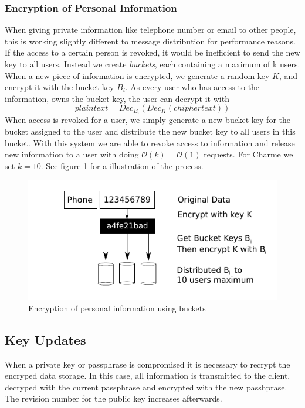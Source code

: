 \documentclass{scrartcl}
\begin{document}
  \subsubsection{Encryption of Personal Information}
  When giving private information like telephone number or email to other people, this is working slightly different to message distribution for performance reasons.  If the access to a certain person is revoked, it would be inefficient to send the new key to all users. Instead we create  \textit{buckets}, each containing a maximum of k users. When a new piece of information is encrypted, we generate a random key $K$, and encrypt it with the bucket key $B_i$. As every user who has access to the information, owns the bucket key, the user can decrypt it with
  $$
  plaintext = Dec_{B_i}({Dec_K(chiphertext)})
  $$
  When access is revoked for a user, we simply generate a new bucket key for the bucket assigned to the user and distribute the new bucket key to all users in this bucket. With this system we are able to revoke access to information and release new information to a user with doing $\mathcal O(k) = \mathcal O(1)$ requests. For Charme we set $k = 10$. See figure \ref{fig3} for a illustration of the process.
  
  
   \begin{figure}[ht]
	\centering
  \includegraphics[]{prvInfo.pdf}
	\caption{Encryption of personal information using buckets}
	\label{fig3}
\end{figure}

    \subsection{Key Updates}
    When a private key or passphrase is compromised  it is necessary to recrypt the encryped data storage. In this case, all information is transmitted to the client, decryped with the current passphrase and encrypted with the new passhprase. The revision number for the public key increases afterwards.
\end{document}
